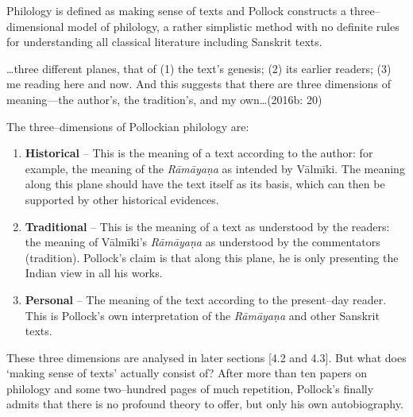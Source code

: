 Philology is defined as making sense of texts and Pollock constructs a three–dimensional model of philology, a rather simplistic method with no definite rules for understanding all classical literature including Sanskrit texts.

\begin{myquote}
…three different planes, that of (1) the text’s genesis; (2) its earlier readers; (3) me reading here and now. And this suggests that there are three dimensions of meaning—the author’s, the tradition’s, and my own…(2016b: 20)
\end{myquote}

The three–dimensions of Pollockian philology are:

\vspace{-.2cm}

\begin{enumerate}
\itemsep=0pt
\item \textbf{Historical} – This is the meaning of a text according to the author: for example, the meaning of the \textit{Rāmāyaṇa} as intended by Vālmīki. The meaning along this plane should have the text itself as its basis, which can then be supported by other historical evidences.

 \item \textbf{Traditional} – This is the meaning of a text as understood by the readers: the meaning of Vālmīki’s \textit{Rāmāyaṇa} as understood by the commentators (tradition). Pollock’s claim is that along this plane, he is only presenting the Indian view in all his works.

 \item \textbf{Personal} – The meaning of the text according to the present–day reader. This is Pollock’s own interpretation of the \textit{Rāmāyaṇa} and other Sanskrit texts.

\end{enumerate}

\vspace{-.2cm}

These three dimensions are analysed in later sections [4.2 and 4.3]. But what does ‘making sense of texts’ actually consist of? After more than ten papers on philology and some two–hundred pages of much repetition, Pollock’s finally admits that there is no profound theory to offer, but only his own autobiography.

